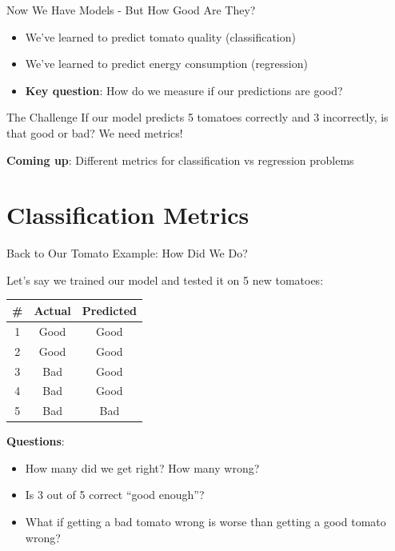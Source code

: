 \documentclass[usenames,dvipsnames]{beamer}
\begin{document}
\begin{frame}{Now We Have Models - But How Good Are They?}
\begin{itemize}
	\item We've learned to predict tomato quality (classification)
	\item We've learned to predict energy consumption (regression)
	\item \pause \textbf{Key question}: How do we measure if our predictions are good?
\end{itemize}

\pause
\begin{examplebox}{The Challenge}
If our model predicts 5 tomatoes correctly and 3 incorrectly, is that good or bad? We need metrics!
\end{examplebox}

\pause
\textbf{Coming up}: Different metrics for classification vs regression problems
\end{frame}

\section{Classification Metrics}

\begin{frame}{Back to Our Tomato Example: How Did We Do?}

Let's say we trained our model and tested it on 5 new tomatoes:

\begin{table}[]
	\begin{tabular}{|c|c||c|}
		\hline 
		\textbf{\#} & \textbf{Actual} & \textbf{Predicted} \\ \hline 
		1 & Good & Good \\
		2 & Good & Good \\
		3 & Bad & Good \\
		4 & Bad & Good \\
		5 & Bad & Bad \\ \hline
	\end{tabular}
\end{table}

\pause \textbf{Questions}: 
\begin{itemize}
	\item How many did we get right? How many wrong?
	\item Is 3 out of 5 correct ``good enough''?
	\item What if getting a bad tomato wrong is worse than getting a good tomato wrong?
\end{itemize}
\end{frame}
\end{document}
